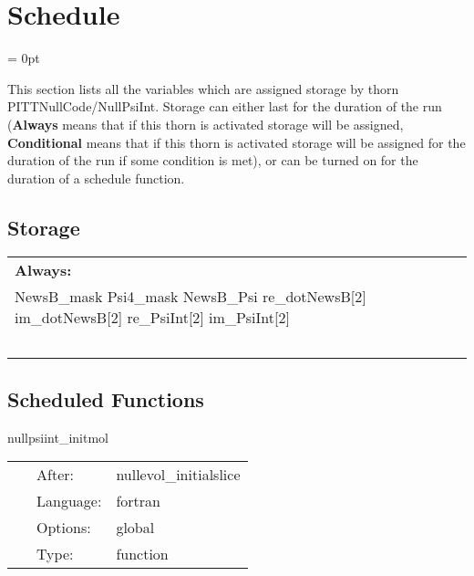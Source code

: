 
\section{Schedule} 


\parskip = 0pt


\noindent This section lists all the variables which are assigned storage by thorn PITTNullCode/NullPsiInt.  Storage can either last for the duration of the run ({\bf Always} means that if this thorn is activated storage will be assigned, {\bf Conditional} means that if this thorn is activated storage will be assigned for the duration of the run if some condition is met), or can be turned on for the duration of a schedule function.


\subsection*{Storage}

\hspace{5mm}

 \begin{tabular*}{160mm}{ll} 

{\bf Always:}&  ~ \\ 
 NewsB\_mask Psi4\_mask NewsB\_Psi re\_dotNewsB[2] im\_dotNewsB[2] re\_PsiInt[2] im\_PsiInt[2] & ~\\ 
~ & ~\\ 
\end{tabular*} 


\subsection*{Scheduled Functions}
\vspace{5mm}


\hspace{5mm} nullpsiint\_initmol 

\hspace{5mm}{\it initial data } 


\hspace{5mm}

 \begin{tabular*}{160mm}{cll} 
~ & After:  & nullevol\_initialslice \\ 
~ & Language:  & fortran \\ 
~ & Options:  & global \\ 
~ & Type:  & function \\ 
\end{tabular*} 


